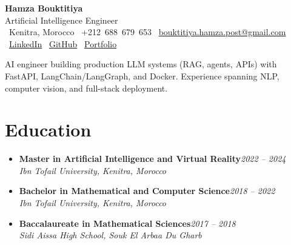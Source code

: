 \documentclass[10pt,a4paper]{article}
\newcommand{\cvname}[1]{{\Huge\bfseries\color{ink}#1}}
\newcommand{\cvtitle}[1]{{\large\color{muted}#1}}
\newcommand{\cvmeta}[1]{{\footnotesize\color{muted}#1}}
\newcommand{\role}[2]{\textbf{#1}\hfill\textit{\color{muted}#2}\\}
\newcommand{\org}[1]{\textit{#1}\\[0.5pt]}
\begin{document}
\normalsize
\setlength{\tabcolsep}{0pt}

\begin{center}
    \cvname{Hamza Bouktitiya}\\[2pt]
    \cvtitle{Artificial Intelligence Engineer}\\[4pt]
    \cvmeta{%
        \faMapMarker*\ Kenitra, Morocco
        \quad\textbullet\quad
        \faPhone*\ +212~688~679~653
        \quad\textbullet\quad
        \faEnvelope*\ \href{mailto:bouktitiya.hamza.post@gmail.com}{bouktitiya.hamza.post@gmail.com}
    }\\[2pt]
    \cvmeta{%
        \faLinkedin*\ \href{https://www.linkedin.com/in/hamza-bouktitiya-604471253/}{LinkedIn}
        \quad\textbullet\quad
        \faGithub*\ \href{https://github.com/gothamza}{GitHub}
        \quad\textbullet\quad
        \faGlobe*\ \href{https://gothamza.github.io/portfolio/}{Portfolio}
    }
\end{center}

\vspace{1pt}
{\footnotesize\color{ink}
AI engineer building production LLM systems (RAG, agents, APIs) with FastAPI, LangChain/LangGraph, and Docker. Experience spanning NLP, computer vision, and full-stack deployment.}

\section*{Education}
\begin{itemize}
    \item \role{Master in Artificial Intelligence and Virtual Reality}{2022 -- 2024}
          \org{Ibn Tofail University, Kenitra, Morocco}

    \item \role{Bachelor in Mathematical and Computer Science}{2018 -- 2022}
          \org{Ibn Tofail University, Kenitra, Morocco}

    \item \role{Baccalaureate in Mathematical Sciences}{2017 -- 2018}
          \org{Sidi Aissa High School, Souk El Arbaa Du Gharb}
\end{itemize}

\end{document}
